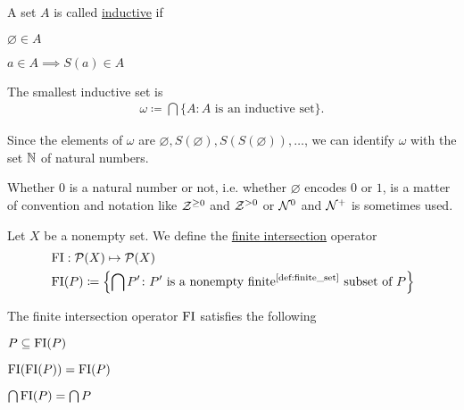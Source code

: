 \begin{definition}\label{def:inductive_set}\cite[68]{Enderton1977}
  A set $A$ is called \ul{inductive} if
  \begin{defenum}
    \item $\varnothing \in A$
    \item $a \in A \implies S(a) \in A$
  \end{defenum}
\end{definition}

\begin{definition}\label{def:natural_numbers_zfc}
  The smallest inductive set is
  \begin{align*}
    \omega \coloneqq \bigcap \{ A \colon A \text{ is an inductive set} \}.
  \end{align*}

  Since the elements of $\omega$ are $\varnothing, S(\varnothing), S(S(\varnothing)), \ldots$, we can identify $\omega$ with the set $\mathbb N$ of natural numbers.

  Whether $0$ is a natural number or not, i.e. whether $\varnothing$ encodes $0$ or $1$, is a matter of convention and notation like $\mathcal Z^{\geq 0}$ and $\mathcal Z^{>0}$ or $\mathcal N^0$ and $\mathcal N^+$ is sometimes used.
\end{definition}

\begin{definition}\label{def:finite_intersection_operator}
  Let $X$ be a nonempty set. We define the \ul{finite intersection} operator
  \begin{align*}
    &\FI: \Power(X) \mapsto \Power(X) \\
    &\FI(P) \coloneqq \left\{ \bigcap P' \colon P' \text{ is a nonempty finite\Tinyref{def:finite_set} subset of } P \right\}
  \end{align*}
\end{definition}

\begin{proposition}\label{thm:finite_intersection_properties}
  The finite intersection operator $\operatorname{FI}$ satisfies the following
  \begin{defenum}
    \item $P \subseteq \operatorname{FI}(P)$
    \item $\operatorname{FI}(\operatorname{FI}(P)) = \operatorname{FI}(P)$
    \item $\bigcap \operatorname{FI}(P) = \bigcap P$
  \end{defenum}
\end{proposition}

